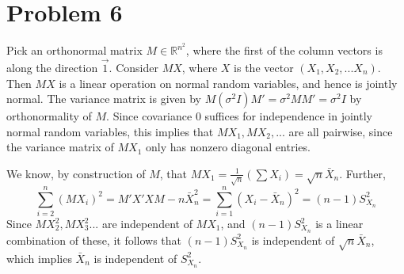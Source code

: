\documentclass[10pt,letter]{article}
\begin{document}
\section*{Problem 6}
Pick an orthonormal matrix $M \in \mathbb{R}^{n^2} $, where the first of the column vectors is along the direction $\vec{1}$. Consider $MX$, where $X$ is the vector $(X_1, X_2, ... X_n)$. Then $MX$ is a linear operation on normal random variables, and hence is jointly normal. The variance matrix is given by $M (\sigma^2 I) M' = \sigma^2 MM' = \sigma^2 I$ by orthonormality of $M$. Since covariance 0 suffices for independence in jointly normal random variables, this implies that $MX_1, MX_2, ...$ are all pairwise, since the variance matrix of $MX_1$ only has nonzero diagonal entries.

We know, by construction of $M$, that $MX_1 = \frac{1}{\sqrt{n}} ( \sum X_i) = \sqrt{n} \bar{X}_n$. Further,
\[ \sum_{i=2}^n (MX_i)^2 = M'X'XM - n \bar{X}_n^2 = \sum_{i=1}^n (X_i - \bar{X}_n)^2 = (n-1)S^2_{X_n} \]
Since $MX_2^2, MX_3^2 ...$ are independent of $MX_1$, and $(n-1)S^2_{X_n}$ is a linear combination of these, it follows that $(n-1)S^2_{X_n}$ is independent of $\sqrt{n} \bar{X}_n$, which implies $\bar{X}_n$ is independent of $S^2_{X_n}$.
\end{document}
